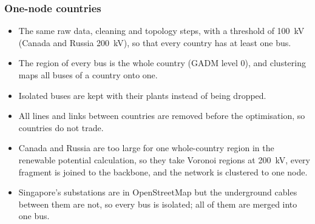 \subsubsection{One-node countries}

\begin{itemize}[nosep,leftmargin=*]
  \item The same raw data, cleaning and topology steps, with a threshold of \SI{100}{kV} (Canada and Russia \SI{200}{kV}), so that every country has at least one bus.
  \item The region of every bus is the whole country (GADM level 0), and clustering maps all buses of a country onto one.
  \item Isolated buses are kept with their plants instead of being dropped.
  \item All lines and links between countries are removed before the optimisation, so countries do not trade.
  \item Canada and Russia are too large for one whole-country region in the renewable potential calculation, so they take Voronoi regions at \SI{200}{kV}, every fragment is joined to the backbone, and the network is clustered to one node.
  \item Singapore's substations are in OpenStreetMap but the underground cables between them are not, so every bus is isolated; all of them are merged into one bus.
\end{itemize}
